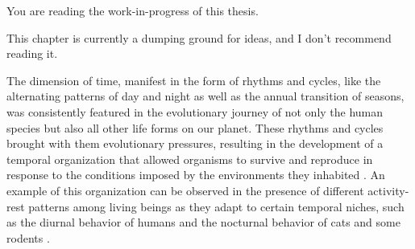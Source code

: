 \documentclass[
12pt,
openright,
oneside,
a4paper,
chapter=TITLE,
section=TITLE,
french,
spanish,
brazil,
english
]{abntex2}\usepackage{array}
\newcommand{\microskip}{\vspace{\microskipamount}}
\begin{document}
\begin{tcolorbox}[enhanced jigsaw, bottomrule=.15mm, titlerule=0mm, toprule=.15mm, coltitle=black, colbacktitle=quarto-callout-important-color!10!white, breakable, leftrule=.75mm, rightrule=.15mm, opacitybacktitle=0.6, colback=white, toptitle=1mm, title=\textcolor{quarto-callout-important-color}{\faExclamation}\hspace{0.5em}{Important}, opacityback=0, colframe=quarto-callout-important-color-frame, bottomtitle=1mm, left=2mm, arc=.35mm]

You are reading the work-in-progress of this thesis.

\microskip

This chapter is currently a dumping ground for ideas, and I don't
recommend reading it.

\end{tcolorbox}

The dimension of time, manifest in the form of rhythms and cycles, like
the alternating patterns of day and night as well as the annual
transition of seasons, was consistently featured in the evolutionary
journey of not only the human species but also all other life forms on
our planet. These rhythms and cycles brought with them evolutionary
pressures, resulting in the development of a temporal organization that
allowed organisms to survive and reproduce in response to the conditions
imposed by the environments they inhabited
\autocite{pittendrigh1981,menna-barreto2003}. An example of this
organization can be observed in the presence of different activity-rest
patterns among living beings as they adapt to certain temporal niches,
such as the diurnal behavior of humans and the nocturnal behavior of
cats and some rodents \autocite{foster2005}.
\end{document}
